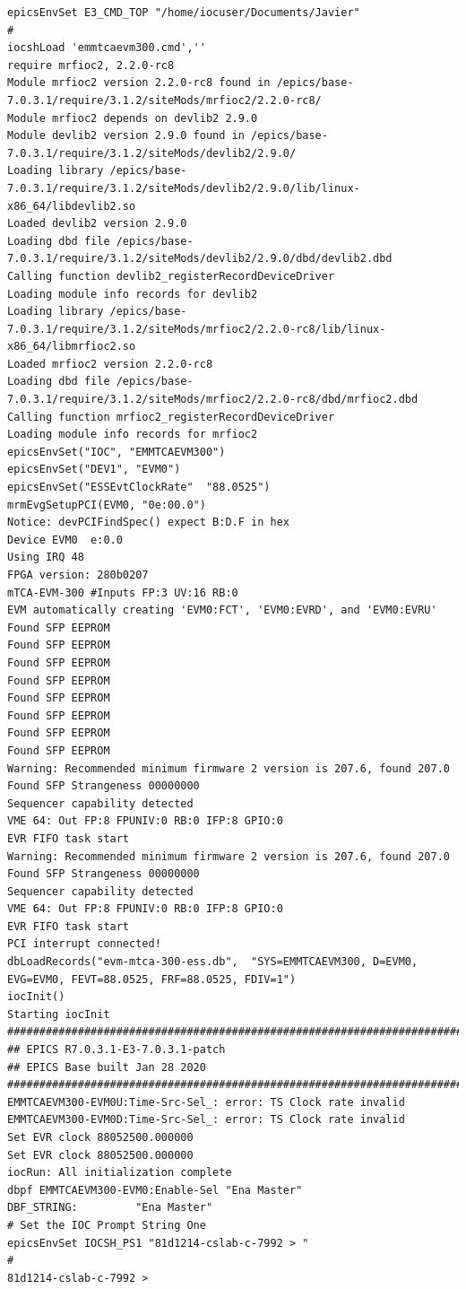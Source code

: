 \documentclass[11pt
  , a4paper
  , article
  , oneside
  , showtrims
]{memoir}
\begin{document}
\begin{lstlisting}[style=termstyle]
epicsEnvSet E3_CMD_TOP "/home/iocuser/Documents/Javier"
#
iocshLoad 'emmtcaevm300.cmd',''
require mrfioc2, 2.2.0-rc8
Module mrfioc2 version 2.2.0-rc8 found in /epics/base-7.0.3.1/require/3.1.2/siteMods/mrfioc2/2.2.0-rc8/
Module mrfioc2 depends on devlib2 2.9.0
Module devlib2 version 2.9.0 found in /epics/base-7.0.3.1/require/3.1.2/siteMods/devlib2/2.9.0/
Loading library /epics/base-7.0.3.1/require/3.1.2/siteMods/devlib2/2.9.0/lib/linux-x86_64/libdevlib2.so
Loaded devlib2 version 2.9.0
Loading dbd file /epics/base-7.0.3.1/require/3.1.2/siteMods/devlib2/2.9.0/dbd/devlib2.dbd
Calling function devlib2_registerRecordDeviceDriver
Loading module info records for devlib2
Loading library /epics/base-7.0.3.1/require/3.1.2/siteMods/mrfioc2/2.2.0-rc8/lib/linux-x86_64/libmrfioc2.so
Loaded mrfioc2 version 2.2.0-rc8
Loading dbd file /epics/base-7.0.3.1/require/3.1.2/siteMods/mrfioc2/2.2.0-rc8/dbd/mrfioc2.dbd
Calling function mrfioc2_registerRecordDeviceDriver
Loading module info records for mrfioc2
epicsEnvSet("IOC", "EMMTCAEVM300")
epicsEnvSet("DEV1", "EVM0")
epicsEnvSet("ESSEvtClockRate"  "88.0525")
mrmEvgSetupPCI(EVM0, "0e:00.0")
Notice: devPCIFindSpec() expect B:D.F in hex
Device EVM0  e:0.0
Using IRQ 48
FPGA version: 280b0207
mTCA-EVM-300 #Inputs FP:3 UV:16 RB:0
EVM automatically creating 'EVM0:FCT', 'EVM0:EVRD', and 'EVM0:EVRU'
Found SFP EEPROM
Found SFP EEPROM
Found SFP EEPROM
Found SFP EEPROM
Found SFP EEPROM
Found SFP EEPROM
Found SFP EEPROM
Found SFP EEPROM
Warning: Recommended minimum firmware 2 version is 207.6, found 207.0
Found SFP Strangeness 00000000
Sequencer capability detected
VME 64: Out FP:8 FPUNIV:0 RB:0 IFP:8 GPIO:0
EVR FIFO task start
Warning: Recommended minimum firmware 2 version is 207.6, found 207.0
Found SFP Strangeness 00000000
Sequencer capability detected
VME 64: Out FP:8 FPUNIV:0 RB:0 IFP:8 GPIO:0
EVR FIFO task start
PCI interrupt connected!
dbLoadRecords("evm-mtca-300-ess.db",  "SYS=EMMTCAEVM300, D=EVM0, EVG=EVM0, FEVT=88.0525, FRF=88.0525, FDIV=1")
iocInit()
Starting iocInit
############################################################################
## EPICS R7.0.3.1-E3-7.0.3.1-patch
## EPICS Base built Jan 28 2020
############################################################################
EMMTCAEVM300-EVM0U:Time-Src-Sel_: error: TS Clock rate invalid
EMMTCAEVM300-EVM0D:Time-Src-Sel_: error: TS Clock rate invalid
Set EVR clock 88052500.000000
Set EVR clock 88052500.000000
iocRun: All initialization complete
dbpf EMMTCAEVM300-EVM0:Enable-Sel "Ena Master"
DBF_STRING:         "Ena Master"
# Set the IOC Prompt String One
epicsEnvSet IOCSH_PS1 "81d1214-cslab-c-7992 > "
#
81d1214-cslab-c-7992 >
\end{lstlisting}
\end{document}
